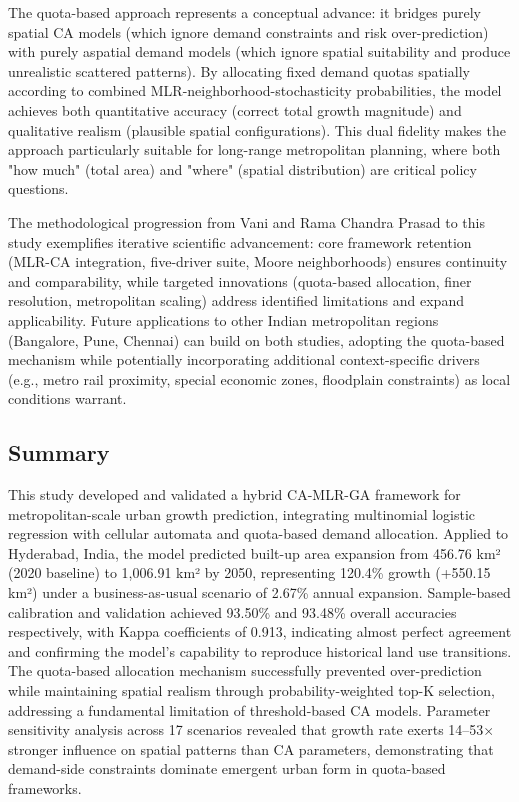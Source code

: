 \documentclass[12pt,a4paper]{article}
\begin{document}
The quota-based approach represents a conceptual advance: it bridges purely spatial CA models (which ignore demand constraints and risk over-prediction) with purely aspatial demand models (which ignore spatial suitability and produce unrealistic scattered patterns). By allocating fixed demand quotas spatially according to combined MLR-neighborhood-stochasticity probabilities, the model achieves both quantitative accuracy (correct total growth magnitude) and qualitative realism (plausible spatial configurations). This dual fidelity makes the approach particularly suitable for long-range metropolitan planning, where both "how much" (total area) and "where" (spatial distribution) are critical policy questions.

The methodological progression from Vani and Rama Chandra Prasad \cite{vani2022} to this study exemplifies iterative scientific advancement: core framework retention (MLR-CA integration, five-driver suite, Moore neighborhoods) ensures continuity and comparability, while targeted innovations (quota-based allocation, finer resolution, metropolitan scaling) address identified limitations and expand applicability. Future applications to other Indian metropolitan regions (Bangalore, Pune, Chennai) can build on both studies, adopting the quota-based mechanism while potentially incorporating additional context-specific drivers (e.g., metro rail proximity, special economic zones, floodplain constraints) as local conditions warrant.


\subsection{Summary}

This study developed and validated a hybrid CA-MLR-GA framework for metropolitan-scale urban growth prediction, integrating multinomial logistic regression with cellular automata and quota-based demand allocation. Applied to Hyderabad, India, the model predicted built-up area expansion from 456.76 km² (2020 baseline) to 1,006.91 km² by 2050, representing 120.4\% growth (+550.15 km²) under a business-as-usual scenario of 2.67\% annual expansion. Sample-based calibration and validation achieved 93.50\% and 93.48\% overall accuracies respectively, with Kappa coefficients of 0.913, indicating almost perfect agreement and confirming the model's capability to reproduce historical land use transitions. The quota-based allocation mechanism successfully prevented over-prediction while maintaining spatial realism through probability-weighted top-K selection, addressing a fundamental limitation of threshold-based CA models. Parameter sensitivity analysis across 17 scenarios revealed that growth rate exerts 14--53$\times$ stronger influence on spatial patterns than CA parameters, demonstrating that demand-side constraints dominate emergent urban form in quota-based frameworks.
\end{document}
